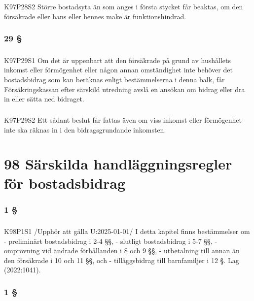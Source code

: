 \documentclass[a4paper,notitlepage,openany,10pt]{book}
\begin{document}
\paragraph*{}
{\tiny K97P28S2}
Större bostadsyta än som anges i första stycket får beaktas, om den försäkrade eller hans eller hennes make är funktionshindrad.
\subsection*{29 §}
\paragraph*{}
{\tiny K97P29S1}
Om det är uppenbart att den försäkrade på grund av hushållets inkomst eller förmögenhet eller någon annan omständighet inte behöver det bostadsbidrag som kan beräknas enligt bestämmelserna i denna balk, får Försäkringskassan efter särskild utredning avslå en ansökan om bidrag eller dra in eller sätta ned bidraget.
\paragraph*{}
{\tiny K97P29S2}
Ett sådant beslut får fattas även om viss inkomst eller förmögenhet inte ska räknas in i den bidragsgrundande inkomsten.
\chapter*{98 Särskilda handläggningsregler för bostadsbidrag}
\subsection*{1 §}
\paragraph*{}
{\tiny K98P1S1}
/Upphör att gälla U:2025-01-01/
I detta kapitel finns bestämmelser om
\newline - preliminärt bostadsbidrag i 2-4 §§,
\newline - slutligt bostadsbidrag i 5-7 §§,
\newline - omprövning vid ändrade förhållanden i 8 och 9 §§,
\newline - utbetalning till annan än den försäkrade i 10 och 11 §§, och
\newline - tilläggsbidrag till barnfamiljer i 12 §.
Lag (2022:1041).
\subsection*{1 §}
\end{document}
